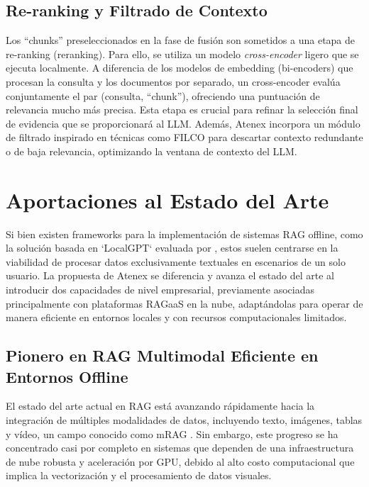 \subsection{Re-ranking y Filtrado de Contexto}
Los ``chunks'' preseleccionados en la fase de fusión son sometidos a una etapa de re-ranking (reranking). Para ello, se utiliza un modelo \emph{cross-encoder} ligero que se ejecuta localmente. A diferencia de los modelos de embedding (bi-encoders) que procesan la consulta y los documentos por separado, un cross-encoder evalúa conjuntamente el par (consulta, ``chunk''), ofreciendo una puntuación de relevancia mucho más precisa. Esta etapa es crucial para refinar la selección final de evidencia que se proporcionará al LLM. Además, Atenex incorpora un módulo de filtrado inspirado en técnicas como FILCO \cite{Wang2023FILCO} para descartar contexto redundante o de baja relevancia, optimizando la ventana de contexto del LLM.

\section{Aportaciones al Estado del Arte}

\noindent
Si bien existen frameworks para la implementación de sistemas RAG offline, como la solución basada en `LocalGPT` evaluada por \cite{Tyndall2025OfflineRAG}, estos suelen centrarse en la viabilidad de procesar datos exclusivamente textuales en escenarios de un solo usuario. La propuesta de Atenex se diferencia y avanza el estado del arte al introducir dos capacidades de nivel empresarial, previamente asociadas principalmente con plataformas RAGaaS en la nube, adaptándolas para operar de manera eficiente en entornos locales y con recursos computacionales limitados.

\subsection{Pionero en RAG Multimodal Eficiente en Entornos Offline}

El estado del arte actual en RAG está avanzando rápidamente hacia la integración de múltiples modalidades de datos, incluyendo texto, imágenes, tablas y vídeo, un campo conocido como mRAG \cite{Drushchak2025mRAG, Zheng2025RAGinVision}. Sin embargo, este progreso se ha concentrado casi por completo en sistemas que dependen de una infraestructura de nube robusta y aceleración por GPU, debido al alto costo computacional que implica la vectorización y el procesamiento de datos visuales.

